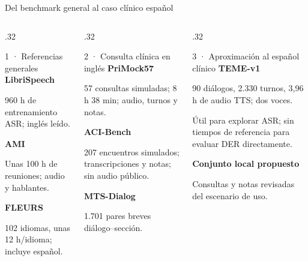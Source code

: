 \documentclass[aspectratio=169,10pt]{beamer}
\begin{document}
\begin{frame}{Del benchmark general al caso clínico español}
  \begin{columns}[T,onlytextwidth]
    \begin{column}{.32\textwidth}
      \begin{block}{\small 1 · Referencias generales}
        \small\textbf{LibriSpeech}\par 960 h de entrenamiento ASR; inglés leído.\par\vspace{3mm}
        \textbf{AMI}\par Unas 100 h de reuniones; audio y hablantes.\par\vspace{3mm}
        \textbf{FLEURS}\par 102 idiomas, unas 12 h/idioma; incluye español.
      \end{block}
    \end{column}
    \begin{column}{.32\textwidth}
      \begin{block}{\small 2 · Consulta clínica en inglés}
        \small\textbf{PriMock57}\par 57 consultas simuladas; 8 h 38 min; audio, turnos y notas.\par\vspace{3mm}
        \textbf{ACI-Bench}\par 207 encuentros simulados; transcripciones y notas; sin audio público.\par\vspace{3mm}
        \textbf{MTS-Dialog}\par 1.701 pares breves diálogo–sección.
      \end{block}
    \end{column}
    \begin{column}{.32\textwidth}
      \begin{block}{\small 3 · Aproximación al español clínico}
        \small\textbf{TEME-v1}\par 90 diálogos, 2.330 turnos, 3,96 h de audio TTS; dos voces.\par\vspace{3mm}
        Útil para explorar ASR; sin tiempos de referencia para evaluar DER directamente.\par\vspace{3mm}
        \textbf{Conjunto local propuesto}\par Consultas y notas revisadas del escenario de uso.
      \end{block}
    \end{column}
  \end{columns}
\end{frame}
\end{document}
